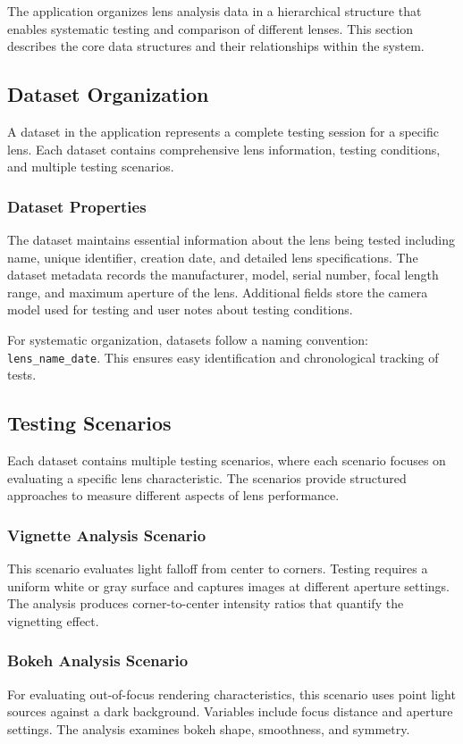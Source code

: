 The application organizes lens analysis data in a hierarchical structure that enables systematic testing and comparison of different lenses. This section describes the core data structures and their relationships within the system.

\subsection{Dataset Organization}
A dataset in the application represents a complete testing session for a specific lens. Each dataset contains comprehensive lens information, testing conditions, and multiple testing scenarios.

\subsubsection{Dataset Properties}
The dataset maintains essential information about the lens being tested including name, unique identifier, creation date, and detailed lens specifications. The dataset metadata records the manufacturer, model, serial number, focal length range, and maximum aperture of the lens. Additional fields store the camera model used for testing and user notes about testing conditions.

For systematic organization, datasets follow a naming convention: \texttt{lens\_name\_date}. This ensures easy identification and chronological tracking of tests.

\subsection{Testing Scenarios}
Each dataset contains multiple testing scenarios, where each scenario focuses on evaluating a specific lens characteristic. The scenarios provide structured approaches to measure different aspects of lens performance.

\subsubsection{Vignette Analysis Scenario}
This scenario evaluates light falloff from center to corners. Testing requires a uniform white or gray surface and captures images at different aperture settings. The analysis produces corner-to-center intensity ratios that quantify the vignetting effect.

\subsubsection{Bokeh Analysis Scenario}
For evaluating out-of-focus rendering characteristics, this scenario uses point light sources against a dark background. Variables include focus distance and aperture settings. The analysis examines bokeh shape, smoothness, and symmetry.

